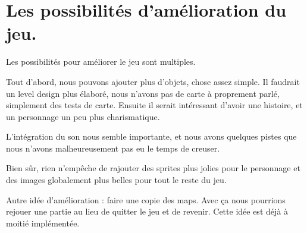 
\section{Les possibilités d'amélioration du jeu.}

Les possibilités pour améliorer le jeu sont multiples.

Tout d'abord, nous pouvons ajouter plus d'objets, chose assez simple.
Il faudrait un level design plus élaboré, nous n'avons pas de carte à proprement parlé, simplement des tests de carte.
Ensuite il serait intéressant d'avoir une histoire, et un personnage un peu plus charismatique.

L'intégration du son nous semble importante, et nous avons quelques pistes que nous n'avons malheureusement pas eu le temps de creuser.

Bien sûr, rien n'empêche de rajouter des sprites plus jolies pour le personnage et des images globalement plus belles pour tout le reste du jeu.


Autre idée d'amélioration : faire une copie des maps.
Avec ça nous pourrions rejouer une partie au lieu de quitter le jeu et de revenir.
Cette idée est déjà à moitié implémentée.

\clearpage
